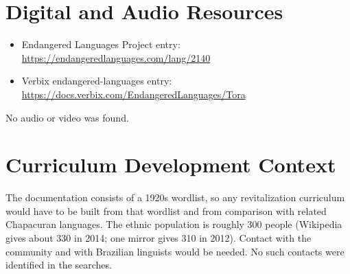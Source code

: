 \documentclass[12pt]{article}
\begin{document}
\section{Digital and Audio Resources}
\begin{itemize}
\item Endangered Languages Project entry: \url{https://endangeredlanguages.com/lang/2140}
\item Verbix endangered-languages entry: \url{https://docs.verbix.com/EndangeredLanguages/Tora}
\end{itemize}
No audio or video was found.

\section{Curriculum Development Context}
The documentation consists of a 1920s wordlist, so any revitalization curriculum would have to be built from that wordlist and from comparison with related Chapacuran languages. The ethnic population is roughly 300 people (Wikipedia gives about 330 in 2014; one mirror gives 310 in 2012). Contact with the community and with Brazilian linguists would be needed. No such contacts were identified in the searches.
\end{document}
